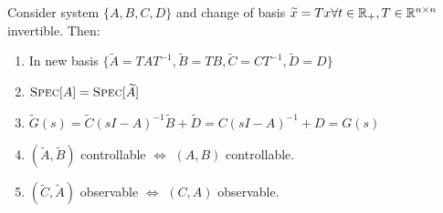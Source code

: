 \begin{Theorem}
Consider system $\{A,B,C,D\}$ and change of basis $\widetilde x=Tx\forall t\in\mathbb R_+,T\in\mathbb R^{n\times n}$ invertible. Then:
\begin{enumerate}[leftmargin=4mm]
  \item In new basis $\{\widetilde A=TAT^{-1},\widetilde B=TB,\widetilde C=CT^{-1},\widetilde D=D\}$
  \item $\textsc{Spec}[A]=\textsc{Spec}[\widetilde A]$
  \item $\widetilde G(s)=\widetilde C(sI-A)^{-1}\widetilde B+\widetilde D=C(sI-A)^{-1}+D=G(s)$
  \item $(\widetilde A,\widetilde B)$ controllable $\Leftrightarrow$ $(A,B)$ controllable.
  \item $(\widetilde C,\widetilde A)$ observable $\Leftrightarrow$ $(C,A)$ observable.
\end{enumerate}
\end{Theorem}





